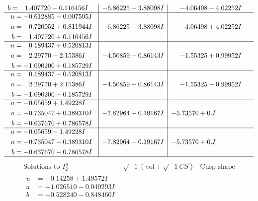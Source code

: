 \documentclass[1p]{elsarticle_modified}
\theoremstyle{definition}
\newcommand{\I}{\sqrt{-1}}
\begin{document}
$$\begin{array}{c|c|c}
\begin{aligned}
b &= \phantom{-}1.407720 - 0.116456 I\end{aligned}
 & -6.86225 + 3.88098 I & -4.06498 - 4.02252 I \\ \hline\begin{aligned}
u &= -0.612885 - 0.007595 I \\
a &= -0.720052 + 0.811944 I \\
b &= \phantom{-}1.407720 + 0.116456 I\end{aligned}
 & -6.86225 - 3.88098 I & -4.06498 + 4.02252 I \\ \hline\begin{aligned}
u &= \phantom{-}0.189437 + 0.520813 I \\
a &= \phantom{-}2.29770 - 2.15386 I \\
b &= -1.090200 + 0.185729 I\end{aligned}
 & -4.50859 + 0.86143 I & -1.55325 + 0.99952 I \\ \hline\begin{aligned}
u &= \phantom{-}0.189437 - 0.520813 I \\
a &= \phantom{-}2.29770 + 2.15386 I \\
b &= -1.090200 - 0.185729 I\end{aligned}
 & -4.50859 - 0.86143 I & -1.55325 - 0.99952 I \\ \hline\begin{aligned}
u &= -0.05659 + 1.49228 I \\
a &= -0.735047 + 0.389310 I \\
b &= -0.637670 + 0.786578 I\end{aligned}
 & -7.82964 - 0.19167 I & -5.73570 + 0. I\phantom{ +0.000000I} \\ \hline\begin{aligned}
u &= -0.05659 - 1.49228 I \\
a &= -0.735047 - 0.389310 I \\
b &= -0.637670 - 0.786578 I\end{aligned}
 & -7.82964 + 0.19167 I & -5.73570 + 0. I\phantom{ +0.000000I}\\
 \hline 
 \end{array}$$\newpage$$\begin{array}{c|c|c}  
\text{Solutions to }I^u_{2}& \I (\text{vol} + \sqrt{-1}CS) & \text{Cusp shape}\\
 \hline 
\begin{aligned}
u &= -0.14258 + 1.49572 I \\
a &= -1.026510 - 0.040293 I \\
b &= -0.528240 - 0.848460 I\end{aligned}

\end{array}$$
\end{document}
